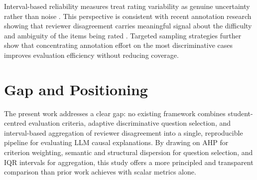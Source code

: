 Interval-based reliability measures treat rating variability as genuine uncertainty
rather than noise \citep{hayes2007answering}. This perspective is consistent with
recent annotation research showing that reviewer disagreement carries meaningful
signal about the difficulty and ambiguity of the items being rated
\citep{beck2024order, zapf2016measuring}. Targeted sampling strategies
\citep{feng2025sample} further show that concentrating annotation effort on the most
discriminative cases improves evaluation efficiency without reducing coverage.

\section{Gap and Positioning}
\label{sec:lit-gap}

The present work addresses a clear gap: no existing framework combines
student-centred evaluation criteria, adaptive discriminative question selection, and
interval-based aggregation of reviewer disagreement into a single, reproducible
pipeline for evaluating LLM causal explanations. By drawing on AHP for criterion
weighting, semantic and structural dispersion for question selection, and IQR
intervals for aggregation, this study offers a more principled and transparent
comparison than prior work achieves with scalar metrics alone.
